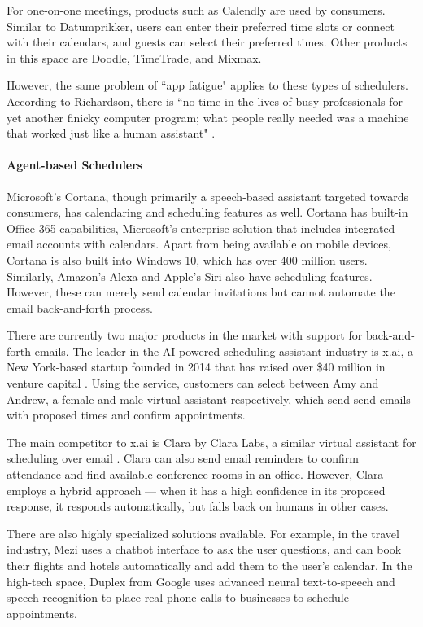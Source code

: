 \documentclass{article}
\begin{document}
For one-on-one meetings, products such as Calendly are used by consumers. Similar to Datumprikker, users can enter their preferred time slots or connect with their calendars, and guests can select their preferred times. Other products in this space are Doodle, TimeTrade, and Mixmax.

However, the same problem of ``app fatigue" applies to these types of schedulers. According to Richardson, there is ``no time in the lives of busy professionals for yet another finicky computer program; what people really needed was a machine that worked just like a human assistant"  \cite{noauthor_ai_nodate}.
 
 \paragraph{Agent-based Schedulers}
 
 Microsoft's Cortana, though primarily a speech-based assistant targeted towards consumers, has calendaring and scheduling features as well. Cortana has built-in Office 365 capabilities, Microsoft's enterprise solution that includes integrated email accounts with calendars. Apart from being available on mobile devices, Cortana is also built into Windows 10, which has over 400 million users. Similarly, Amazon's Alexa and Apple's Siri also have scheduling features. However, these can merely send calendar invitations but cannot automate the email back-and-forth process.
 
 There are currently two major products in the market with support for back-and-forth emails. The leader in the AI-powered scheduling assistant industry is x.ai, a New York-based startup founded in 2014 that has raised over \$40 million in venture capital \cite{noauthor_x.ais_2018}. Using the service, customers can select between Amy and Andrew, a female and male virtual assistant respectively, which send send emails with proposed times and confirm appointments.
 
The main competitor to x.ai is Clara by Clara Labs, a similar virtual assistant for scheduling over email \cite{noauthor_clara_nodate}. Clara can also send email reminders to confirm attendance and find available conference rooms in an office. However, Clara employs a hybrid approach --- when it has a high confidence in its proposed response, it responds automatically, but falls back on humans in other cases.

There are also highly specialized solutions available. For example, in the travel industry, Mezi uses a chatbot interface to ask the user questions, and can book their flights and hotels automatically and add them to the user's calendar. In the high-tech space, Duplex from Google uses advanced neural text-to-speech and speech recognition to place real phone calls to businesses to schedule appointments.
\end{document}
